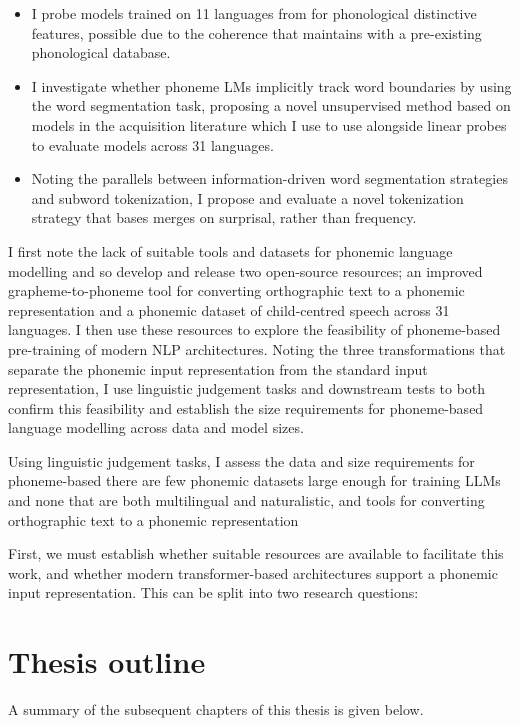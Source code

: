 \begin{itemize}
    \item I probe models trained on 11 languages from \ipachildes for phonological distinctive features, possible due to the coherence that \gpp maintains with a pre-existing phonological database. 
    \item I investigate whether phoneme LMs implicitly track word boundaries by using the word segmentation task, proposing a novel unsupervised method based on models in the acquisition literature which I use to use alongside linear probes to evaluate models across 31 languages.
    \item Noting the parallels between information-driven word segmentation strategies and subword tokenization, I propose and evaluate a novel tokenization strategy that bases merges on surprisal, rather than frequency.
\end{itemize}

I first note the lack of suitable tools and datasets for phonemic language modelling and so develop and release two open-source resources; an improved grapheme-to-phoneme tool for converting orthographic text to a phonemic representation and a phonemic dataset of child-centred speech across 31 languages. I then use these resources to explore the feasibility of phoneme-based pre-training of modern NLP architectures. Noting the three transformations that separate the phonemic input representation from the standard input representation, I use linguistic judgement tasks and downstream tests to both confirm this feasibility and establish the size requirements for phoneme-based language modelling across data and model sizes. 

Using linguistic judgement tasks, I assess the data and size requirements for phoneme-based there are few phonemic datasets large enough for training LLMs and none that are both multilingual and naturalistic, and tools for converting orthographic text to a phonemic representation 


First, we must establish whether suitable resources are available to facilitate this work, and whether modern transformer-based architectures support a phonemic input representation. This can be split into two research questions:

\section{Thesis outline}

A summary of the subsequent chapters of this thesis is given below.

